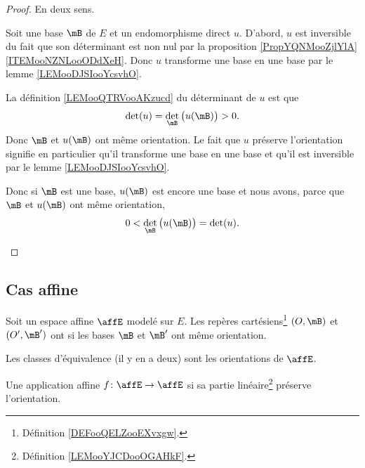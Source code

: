 \begin{proof}
	En deux sens.
	\begin{subproof}
		Soit une base \( \mB\) de \( E\) et un endomorphisme direct \( u\). D'abord, \( u\) est inversible du fait que son déterminant est non nul par la proposition \ref{PropYQNMooZjlYlA}\ref{ITEMooNZNLooODdXeH}. Donc \( u\) transforme une base en une base par le lemme \ref{LEMooDJSIooYcsvhO}.

		La définition \ref{LEMooQTRVooAKzucd} du déterminant de \( u\) est que
		\begin{equation}
			\det(u)=\det_{\mB}\big( u(\mB) \big)>0.
		\end{equation}
		Donc \( \mB\) et \( u(\mB)\) ont même orientation.
		Le fait que \( u\) préserve l'orientation signifie en particulier qu'il transforme une base en une base et qu'il est inversible par le lemme \ref{LEMooDJSIooYcsvhO}.

		Donc si \( \mB\) est une base, \( u(\mB)\) est encore une base et nous avons, parce que \( \mB\) et \( u(\mB)\) ont même orientation,
		\begin{equation}
			0<\det_{\mB}\big( u(\mB) \big)=\det(u).
		\end{equation}
	\end{subproof}
\end{proof}

\subsection{Cas affine}

\begin{definition}      \label{DEFooOTFPooIVkHFP}
	Soit un espace affine \( \affE\) modelé sur \( E\). Les repères cartésiens\footnote{Définition \ref{DEFooQELZooEXvxgw}.} \( (O,\mB)\) et \( (O',\mB')\) ont  si les bases \( \mB\) et \( \mB'\) ont même orientation.

	Les classes d'équivalence (il y en a deux) sont les orientations de \( \affE\).

	Une application affine \( f\colon \affE\to \affE\)  si sa partie linéaire\footnote{Définition \ref{LEMooYJCDooOGAHkF}.} préserve l'orientation.
\end{definition}


